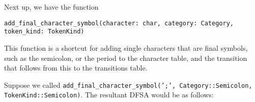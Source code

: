 \documentclass{article}
\newcommand{\code}[1]{\texttt{#1}}
\begin{document}
\begin{figure}[H]
    \begin{subfigure}[t]{0.5\textwidth}
        \centering
    \end{subfigure}
    \begin{subfigure}[t]{0.5\textwidth}
        \centering
    \end{subfigure}
\end{figure}

Next up, we have the function

\begin{center}
    \code{add\_final\_character\_symbol(character: char, category: Category, token\_kind: TokenKind)}
\end{center}

This function is a shortcut for adding single characters that are final symbols,
such as the semicolon, or the period to the character table, and the transition
that follows from this to the transitions table.

Suppose we called \code{add\_final\_character\_symbol(';',
    Category::Semicolon,} \\ \code{TokenKind::Semicolon)}. The resultant DFSA would
be as follows:
\end{document}
